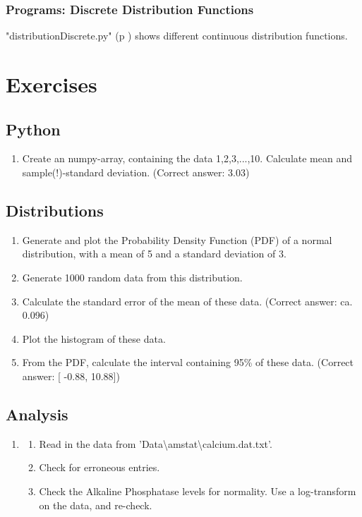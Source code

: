 \subsubsection{Programs: Discrete Distribution Functions} 

\PyImg "distributionDiscrete.py" (p \pageref{py:discrete}) shows different continuous distribution functions.

\section{Exercises}

\subsection{Python}
\begin{enumerate}
  \item Create an numpy-array, containing the data 1,2,3,...,10. Calculate mean and sample(!)-standard deviation.
    (Correct answer: 3.03)
\end{enumerate}

\subsection{Distributions}


\begin{enumerate}
  \item  Generate and plot the Probability Density Function (PDF) of a normal distribution, with a mean of 5 and a standard deviation of 3.
  \item  Generate 1000 random data from this distribution.
  \item  Calculate the standard error of the mean of these data.
    (Correct answer: ca. 0.096)

  \item  Plot the histogram of these data.
  \item  From the PDF, calculate the interval containing 95\% of these data.
    (Correct answer: [ -0.88, 10.88])
\end{enumerate}

\subsection{Analysis}
\begin{enumerate}
  \item
  \begin{enumerate}
    \item Read in the data from 'Data\textbackslash amstat\textbackslash calcium.dat.txt'.
    \item Check for erroneous entries.
    \item Check the Alkaline Phosphatase levels for normality. Use a log-transform on the data, and re-check.
  \end{enumerate}

\end{enumerate}

